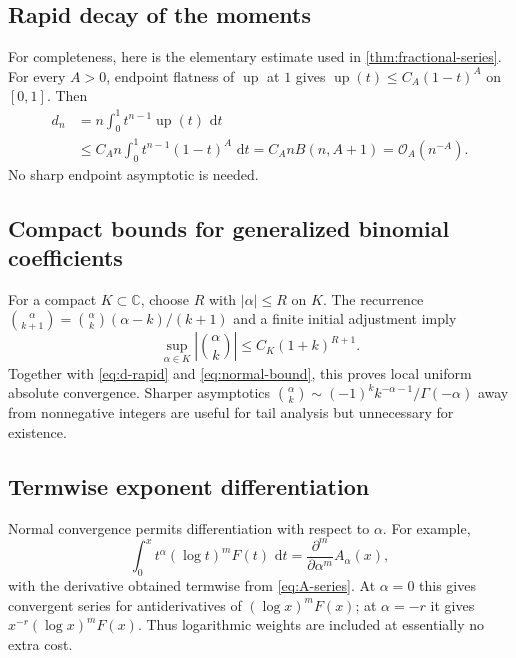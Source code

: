 \documentclass[11pt,oneside]{article}
\numberwithin{equation}{section}
\theoremstyle{definition}
\theoremstyle{remark}
\newcommand{\C}{\mathbb C}
\newcommand{\Up}{\operatorname{up}}
\newcommand{\dd}{\,\mathrm d}
\newcommand{\bigO}{\mathcal O}
\begin{document}
\subsection{Rapid decay of the moments}

For completeness, here is the elementary estimate used in \cref{thm:fractional-series}.
For every $A>0$, endpoint flatness of $\Up$ at $1$ gives
$\Up(t)\le C_A(1-t)^A$ on $[0,1]$.  Then
\begin{align}
 d_n
 &=n\int_0^1t^{n-1}\Up(t)\,\dd t\\
 &\le C_An\int_0^1t^{n-1}(1-t)^A\,\dd t
 =C_AnB(n,A+1)=\bigO_A(n^{-A}).                              \label{eq:rapid-proof}
\end{align}
No sharp endpoint asymptotic is needed.

\subsection{Compact bounds for generalized binomial coefficients}

For a compact $K\subset\C$, choose $R$ with $|\alpha|\le R$ on $K$.  The recurrence
\(
\binom\alpha{k+1}=\binom\alpha k(\alpha-k)/(k+1)
\)
and a finite initial adjustment imply
\begin{equation}
 \sup_{\alpha\in K}|\binom\alpha k|\le C_K(1+k)^{R+1}.        \label{eq:binom-compact}
\end{equation}
Together with \eqref{eq:d-rapid} and \eqref{eq:normal-bound}, this proves local uniform
absolute convergence.  Sharper asymptotics
$\binom\alpha k\sim(-1)^kk^{-\alpha-1}/\Gamma(-\alpha)$ away from nonnegative integers are
useful for tail analysis but unnecessary for existence.

\subsection{Termwise exponent differentiation}

Normal convergence permits differentiation with respect to $\alpha$.  For example,
\begin{equation}
 \int_0^xt^\alpha(\log t)^mF(t)\,\dd t
 =\frac{\partial^m}{\partial\alpha^m}A_\alpha(x),             \label{eq:log-powers}
\end{equation}
with the derivative obtained termwise from \eqref{eq:A-series}.  At $\alpha=0$ this gives
convergent series for antiderivatives of $(\log x)^mF(x)$; at $\alpha=-r$ it gives
$x^{-r}(\log x)^mF(x)$.  Thus logarithmic weights are included at essentially no extra cost.
\end{document}
